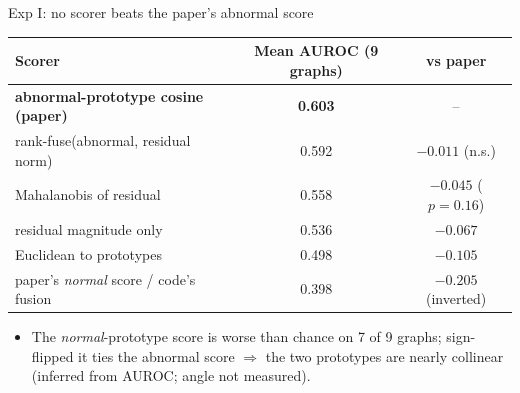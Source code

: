 \documentclass[aspectratio=169,11pt]{beamer}
\begin{document}
\begin{frame}{Exp I: no scorer beats the paper's abnormal score}
\centering\small
\begin{tabular}{lcc}
\toprule
Scorer & Mean AUROC (9 graphs) & vs paper \\ \midrule
\textbf{abnormal-prototype cosine (paper)} & \textbf{0.603} & -- \\
rank-fuse(abnormal, residual norm) & 0.592 & $-0.011$ (n.s.) \\
Mahalanobis of residual & 0.558 & $-0.045$ ($p{=}0.16$) \\
residual magnitude only & 0.536 & $-0.067$ \\
Euclidean to prototypes & 0.498 & $-0.105$ \\
\textcolor{bad}{paper's \emph{normal} score / code's fusion} & \textcolor{bad}{0.398} & \textcolor{bad}{$-0.205$ (inverted)} \\
\bottomrule
\end{tabular}
\vspace{6pt}
\begin{itemize}
\item The \emph{normal}-prototype score is worse than chance on 7 of 9 graphs; sign-flipped it ties the abnormal score $\Rightarrow$ the two prototypes are \alert{nearly collinear} (inferred from AUROC; angle not measured).
\end{itemize}
\end{frame}
\end{document}
